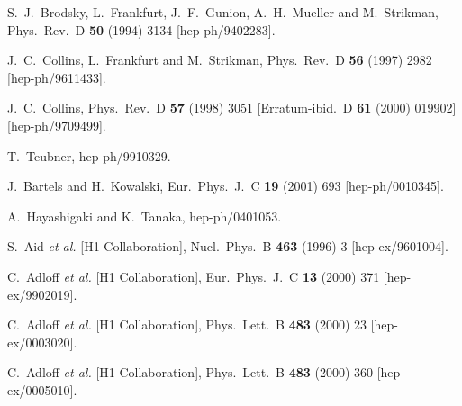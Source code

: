 \begin{thebibliography}{999}
S.~J.~Brodsky, L.~Frankfurt, J.~F.~Gunion, A.~H.~Mueller and M.~Strikman,
Phys.\ Rev.\ D {\bf 50} (1994) 3134 
[hep-ph/9402283].

J.~C.~Collins, L.~Frankfurt and M.~Strikman,
Phys.\ Rev.\ D {\bf 56} (1997) 2982 
[hep-ph/9611433].

J.~C.~Collins,
Phys.\ Rev.\ D {\bf 57} (1998) 3051 
[Erratum-ibid.\ D {\bf 61} (2000) 019902]
[hep-ph/9709499].

T.~Teubner,
hep-ph/9910329.

J.~Bartels and H.~Kowalski,
Eur.\ Phys.\ J.\ C {\bf 19} (2001) 693 
[hep-ph/0010345].

A.~Hayashigaki and K.~Tanaka,
hep-ph/0401053.


S.~Aid {\it et al.}  [H1 Collaboration],
Nucl.\ Phys.\ B {\bf 463} (1996) 3 
[hep-ex/9601004].

C.~Adloff {\it et al.}  [H1 Collaboration],
Eur.\ Phys.\ J.\ C {\bf 13} (2000) 371 
[hep-ex/9902019].

C.~Adloff {\it et al.}  [H1 Collaboration],
Phys.\ Lett.\ B {\bf 483} (2000) 23 
[hep-ex/0003020].

C.~Adloff {\it et al.}  [H1 Collaboration],
Phys.\ Lett.\ B {\bf 483} (2000) 360 
[hep-ex/0005010].


\end{thebibliography}
